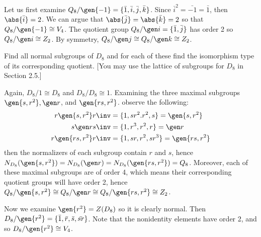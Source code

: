 \begin{problems}
\begin{sol}
        Let us first examine $Q_8/\gen{-1} = \{\bar 1, \bar i, \bar j, \bar k\}$. Since $\bar i^2 = \bar{-1} = \bar 1$, then $\abs{\bar i} = 2$. We can argue that $\abs{\bar j} = \abs{\bar k} = 2$ so that $Q_8/\gen{-1} \cong V_4$. The quotient group $Q_8/\gen i = \{\bar 1, \bar j\}$ has order 2 so $Q_8/\gen i \cong Z_2$. By symmetry, $Q_8/\gen j \cong Q_8/\gen k \cong Z_2$.
    \end{sol}
    \item Find all normal subgroups of $D_8$ and for each of these find the isomorphism type of its corresponding quotient. [You may use the lattice of subgroups for $D_8$ in Section 2.5.]
    \begin{sol}
        Again, $D_8/1 \cong D_8$ and $D_8/D_8 \cong 1$. Examining the three maximal subgroups $\gen{s, r^2}, \gen r$, and $\gen{rs, r^2}$. observe the following:
        \begin{align*}
            r\gen{s, r^2}r\inv & = \{1, sr^2. r^2, s\} = \gen{s, r^2} \\
            s\gen r s\inv & = \{1, r^3, r^2, r\} = \gen r \\
            r\gen{rs, r^2}r\inv & = \{1, sr, r^2, sr^3\} = \gen{rs, r^2}
        \end{align*}
        then the normalizers of each subgroup contain $r$ and $s$, hence $N_{D_8}(\gen{s, r^2}) = N_{D_8}(\gen r) = N_{D_8}(\gen{rs, r^2}) = Q_8$. Moreover, each of these maximal subgroups are of order 4, which means their corresponding quotient groups will have order 2, hence $Q_8/\gen{s, r^2} \cong Q_8/\gen r \cong Q_8/\gen{rs, r^2} \cong Z_2$.

        Now we examine $\gen{r^2} = Z(D_8)$ so it is clearly normal. Then $D_8/\gen{r^2} = \{\bar 1, \bar r, \bar s, \bar{sr}\}$. Note that the nonidentity elements have order 2, and so $D_8/\gen{r^2} \cong V_4$.


\end{sol}
\end{problems}
